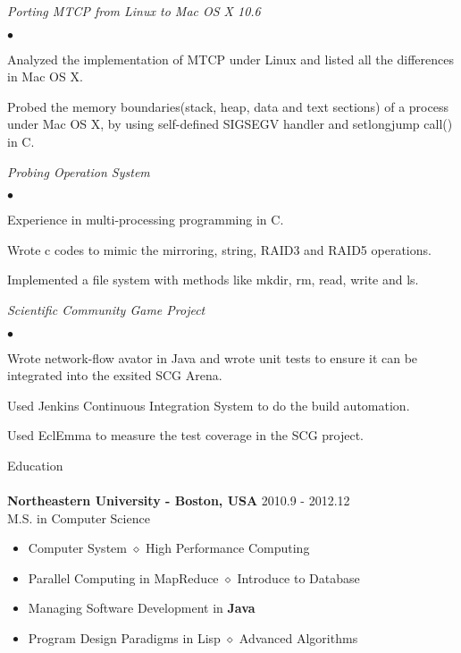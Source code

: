 \documentclass[10pt]{article}
\newcommand{\lineunder}{\vspace*{-8pt}\\\hspace*{-18pt}\hrulefill\\}
\newcommand{\header}[1]{{\hspace*{-15pt}\vspace*{6pt}\large{{#1}}}\vspace*{-6pt}\lineunder}
\newcommand{\project}[1]{\checkmark\normalsize{{\emph{#1}}}\\}
\newenvironment{achievements}
    {\begin{list}
        {$\bullet$}{\topsep 0pt \itemsep -1pt}} 
    {\end{list}}
\newcommand{\college}[5]{
    \textbf{#1 #2} \hfill #3 \\ #4 \\ #5
}
\begin{document}
  \project{Porting MTCP from Linux to Mac OS X 10.6}
  \begin{achievements}
\item Analyzed the implementation of MTCP under Linux and listed all the differences in Mac OS X.
\item Probed the memory boundaries(stack, heap, data and text sections) of a process under Mac OS X, by using self-defined SIGSEGV handler and setlongjump call() in C.
  \end{achievements}

\project{Probing Operation System}
  \begin{achievements}
\item Experience in multi-processing programming in C.
\item Wrote c codes to mimic the mirroring, string, RAID3 and RAID5 operations.
\item Implemented a file system with methods like mkdir, rm, read, write and ls.
  \end{achievements}

\project{Scientific Community Game Project}
  \begin{achievements}
\item Wrote network-flow avator in Java and wrote unit tests to ensure it can be integrated into the exsited SCG Arena.
\item Used Jenkins Continuous Integration System to do the build automation.
\item Used EclEmma to measure the test coverage in the SCG project.
  \end{achievements}

\vspace*{10pt}


\header{Education}

\college{Northeastern University}{- Boston, USA} {2010.9 - 2012.12}
{M.S. in Computer Science}
{
\begin{itemize}
  \setlength{\itemsep}{0pt}
  \setlength{\parsep}{0pt}
  \setlength{\parskip}{0pt}
  \item {Computer System $\diamond$ High Performance Computing}
  \item {Parallel Computing in MapReduce $\diamond$ Introduce to Database}
  \item {Managing Software Development in \textbf{Java}}
  \item {Program Design Paradigms in Lisp $\diamond$ Advanced Algorithms}  
\end{itemize}
}
\end{document}
